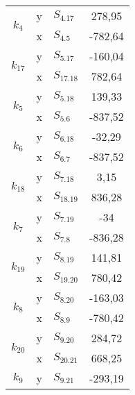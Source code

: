 \begin{table}[htbp]
\begin{tabular}{|c|l|l|c|}
\multirow{2}{*}{$k_{4}$}  & y                  & $S_{4.17}$            & 278,95            \\ \cline{2-4} 
                          & x                  & $S_{4.5}$             & -782,64         \\ \hline
\multirow{2}{*}{$k_{17}$} & y                  & $S_{5.17}$            & -160,04           \\ \cline{2-4} 
                          & x                  & $S_{17.18}$           & 782,64          \\ \hline
\multirow{2}{*}{$k_{5}$}  & y                  & $S_{5.18}$            & 139,33            \\ \cline{2-4} 
                          & x                  & $S_{5.6}$             & -837,52         \\ \hline
\multirow{2}{*}{$k_{6}$}  & y                  & $S_{6.18}$            & -32,29               \\ \cline{2-4} 
                          & x                  & $S_{6.7}$             & -837,52         \\ \hline
\multirow{2}{*}{$k_{18}$} & y                  & $S_{7.18}$            & 3,15              \\ \cline{2-4} 
                          & x                  & $S_{18.19}$           & 836,28          \\ \hline
\multirow{2}{*}{$k_{7}$}  & y                  & $S_{7.19}$            & -34           \\ \cline{2-4} 
                          & x                  & $S_{7.8}$             & -836,28          \\ \hline
\multirow{2}{*}{$k_{19}$} & y                  & $S_{8.19}$            & 141,81            \\ \cline{2-4} 
                          & x                  & $S_{19.20}$           & 780,42       \\ \hline
\multirow{2}{*}{$k_{8}$}  & y                  & $S_{8.20}$            & -163,03          \\ \cline{2-4} 
                          & x                  & $S_{8.9}$             & -780,42        \\ \hline
\multirow{2}{*}{$k_{20}$} & y                  & $S_{9.20}$            & 284,72            \\ \cline{2-4} 
                          & x                  & $S_{20.21}$           & 668,25            \\ \hline
\multirow{2}{*}{$k_{9}$}  & y                  & $S_{9.21}$            & -293,19           \\ \cline{2-4} 

\end{tabular}
\end{table}
